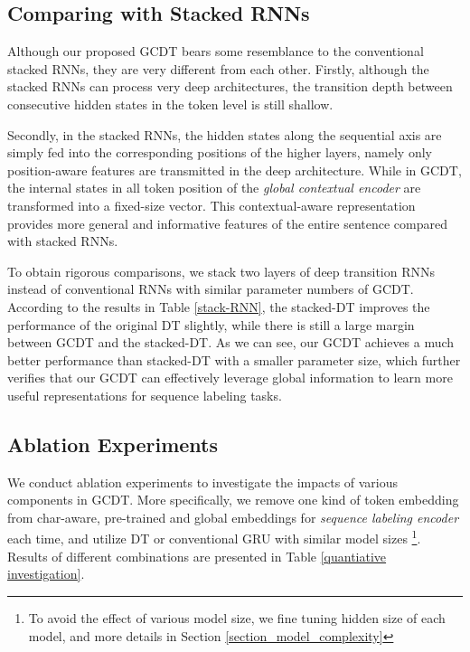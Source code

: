 \documentclass[11pt,a4paper]{article}
\begin{document}
\subsection{Comparing with Stacked RNNs}
Although our proposed GCDT bears some resemblance to the conventional stacked RNNs, they are very different from each other. Firstly, although the stacked RNNs can process very deep architectures, the transition depth between consecutive hidden states in the token level is still shallow.

Secondly, in the stacked RNNs, the hidden states along the sequential axis are simply fed into the corresponding positions of the higher layers, namely only position-aware features are transmitted in the deep architecture. While in GCDT, the internal states in all token position of the \emph{global contextual encoder} are transformed into a fixed-size vector.
This contextual-aware representation provides more general and informative features of the entire sentence compared with stacked RNNs.

To obtain rigorous comparisons, we stack two layers of deep transition RNNs instead of conventional RNNs with similar parameter numbers of GCDT. 
According to the results in Table \ref{stack-RNN},
the stacked-DT improves the performance of the original DT slightly, while there is still a large margin between GCDT and the stacked-DT. 
As we can see, our GCDT achieves a much better performance than stacked-DT with a smaller parameter size, which further verifies that our GCDT can effectively leverage global information to learn more useful representations for sequence labeling tasks. 

\begin{table}[t!]
\begin{center}
\end{center}
\caption{Comparison of CoNLL03 test  between stacked RNNs and GCDT.}
\label{stack-RNN}
\end{table}

\subsection{Ablation Experiments} 
We conduct ablation experiments to investigate the impacts of various components in GCDT. More specifically, we remove one kind of token embedding from char-aware, pre-trained and global embeddings for \emph{sequence labeling encoder} each time, and utilize DT or conventional GRU with similar model sizes \footnote{To avoid the effect of various model size, we fine tuning hidden size of each model, and more details in Section \ref{section_model_complexity}}.
Results of different combinations are presented in Table \ref{quantiative investigation}.
\end{document}

